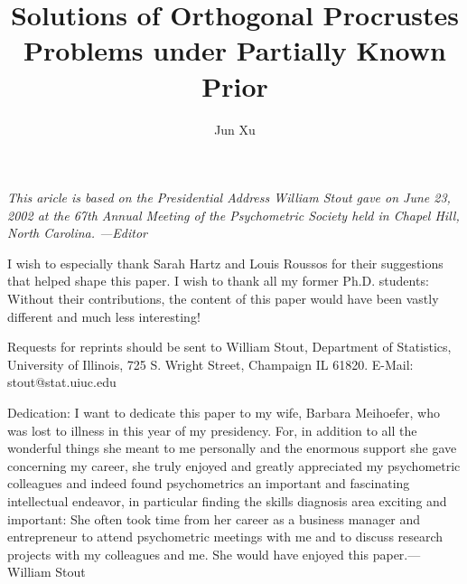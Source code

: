 \documentclass[titlepage,11pt,twoside]{article}
\begin{document}
\begin{titlepage}


\title{Solutions of Orthogonal Procrustes Problems under Partially Known  Prior}

\author{Jun Xu }



\vspace{\fill}

\begin{quote}
\fontsize{8}{9}\selectfont \textit{}
\end{quote}

\vspace{\fill}

\fontsize{8}{10}\selectfont

\textit{This aricle is based on the Presidential Address William
Stout gave on June 23, 2002 at the 67th Annual Meeting of the
Psychometric Society held in Chapel Hill, North Carolina.
---Editor}\vskip2pt

I wish to especially thank Sarah Hartz and Louis Roussos for their
suggestions that helped shape this paper. I wish to thank all my
former Ph.D. students: Without their contributions, the content of
this paper would have been vastly different and much less
interesting!\vskip2pt

Requests for reprints should be sent to William Stout, Department
of Statistics, University of Illinois, 725 S. Wright Street,
Champaign IL 61820. E-Mail: stout@stat.uiuc.edu\vskip2pt

\textsf{Dedication: I want to dedicate this paper to my wife,
Barbara Meihoefer, who was lost to illness in this year of my
presidency. For, in addition to all the wonderful things she meant
to me personally and the enormous support she gave concerning my
career, she truly enjoyed and greatly appreciated my psychometric
colleagues and indeed found psychometrics an important and
fascinating intellectual endeavor, in particular finding the
skills diagnosis area exciting and important: She often took time
from her career as a business manager and entrepreneur to attend
psychometric meetings with me and to discuss research projects
with my colleagues and me. She would have enjoyed this
paper.---William Stout}


\end{titlepage}\vspace*{24pt}
\end{document}
